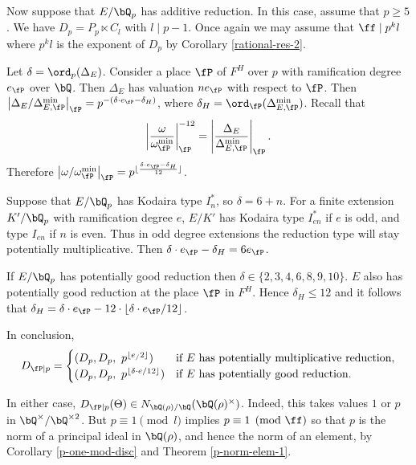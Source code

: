 Now suppose that $E / \bQ_p$ has additive reduction. In this case, assume that $p \geq 5$. We have $D_p = P_p \ltimes C_l$ with $ l \mid p - 1$.  
Once again we may assume that $\ff \mid p^k l$ where $p^k l $ is the exponent of $D_p$ by Corollary \ref{rational-res-2}.

Let $\delta = \ord_p(\Delta_E)$. Consider a place $\fP$ of $F^H$ over $p$ with ramification degree  $e_{\fP}$ over $\bQ$. Then $\Delta_E$ has valuation $n e_{\fP}$ with respect to $\fP$. Then $\left| \Delta_E / \Delta_{E, \fP}^{\min} \right|_{\fP} = p^{-(\delta\cdot e_{\fP} - \delta_H)}$, where $\delta_H = \ord_{\fP}(\Delta_{E, \fP}^{\min})$.
Recall that
\[ \left| \frac{\omega}{\omega_{\fP}^{\min}} \right|_{\fP}^{-12} = \left| \frac{\Delta_E}{\Delta_{E, \fP}^{\min}} \right|_{\fP} .\] 
Therefore $\left| \omega / \omega_{\fP}^{\min} \right|_{\fP} = p^{\floor{\frac{\delta\cdot e_{\fP} - \delta_H}{12}}}$.

Suppose that $E / \bQ_p$ has Kodaira type $I_n^*$, so $\delta = 6 + n$. For a finite extension $K' / \bQ_p$ with ramification degree $e$, $E / K'$ has Kodaira type $I_{en}^*$ if $e$ is odd, and type $I_{en}$ if $n$ is even. Thus in odd degree extensions the reduction type will stay potentially multiplicative. Then $\delta \cdot e_{\fP} - \delta_H = 6 e_{\fP}$.

If $E / \bQ_p$ has potentially good reduction then $\delta \in \{2,3,4,6,8,9,10 \}$. $E$ also has potentially good reduction at the place $\fP$ in $F^H$. Hence $\delta_H \leq 12$ and it follows that $\delta_H = \delta \cdot e_\fP - 12 \cdot \floor{\delta \cdot e_\fP /12}$.

In conclusion, 
\[ D_{\fP \mid p} = 
    \begin{cases}
        (D_p, D_p,\ p^{\floor{e_ /2}}) & \text{if } E \text{ has potentially multiplicative reduction}, \\
        (D_p, D_p,\ p^{\floor{\delta \cdot e/12}}) & \text{if } E \text { has potentially good reduction}.
    \end{cases}
    \]

In either case, $D_{\fP \mid p}(\Theta) \in N_{\bQ(\rho) / \bQ}(\bQ(\rho)^{\times})$. Indeed, this takes values $1$ or $p$ in $\bQ^{\times} / \bQ^{\times 2}$. But $p \equiv 1 \pmod l$ implies $p \equiv 1 \pmod \ff$ so that $p$ is the norm of a principal ideal in $\bQ(\rho)$, and hence the norm of an element, by Corollary \ref{p-one-mod-disc} and Theorem \ref{p-norm-elem-1}.

